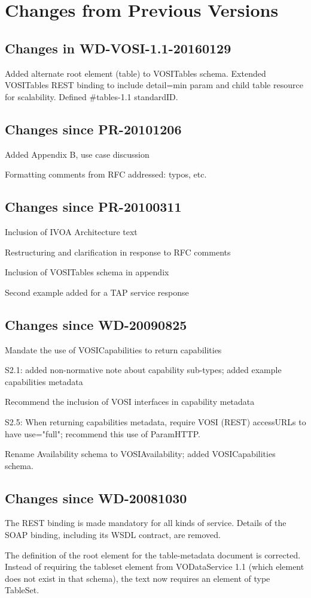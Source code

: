 \documentclass[11pt,letter]{ivoa}
\begin{document}
\section{Changes from Previous Versions}

\subsection{Changes in WD-VOSI-1.1-20160129}

Added alternate root element (table) to VOSITables schema. Extended VOSITables REST binding to include detail=min param and child table resource for scalability. Defined \#tables-1.1 standardID.

\subsection{Changes since PR-20101206}

Added Appendix B, use case discussion
    
Formatting comments from RFC addressed: typos, etc.

\subsection{Changes since PR-20100311}

Inclusion of IVOA Architecture text

Restructuring and clarification in response to RFC comments

Inclusion of VOSITables schema in appendix

Second example added for a TAP service response

\subsection{Changes since WD-20090825}

Mandate the use of VOSICapabilities to return capabilities

S2.1: added non-normative note about capability sub-types; added example capabilities metadata

Recommend the inclusion of VOSI interfaces in capability metadata

S2.5: When returning capabilities metadata, require VOSI (REST) accessURLs to have use="full"; recommend this use of ParamHTTP.

Rename Availability schema to VOSIAvailability; added VOSICapabilities schema.

\subsection{Changes since WD-20081030}

The REST binding is made mandatory for all kinds of service. Details of the SOAP binding, including its WSDL contract, are removed.

The definition of the root element for the table-metadata document is corrected. Instead of requiring the tableset element from VODataService 1.1 (which element does not exist in that schema), the text now requires an element of type TableSet. 



\end{document}
